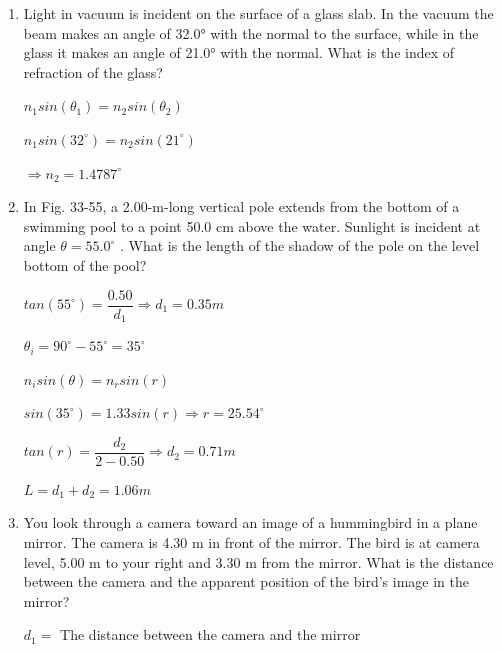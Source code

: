 \documentclass[fleqn]{article}
\begin{document}
  \begin{enumerate}
    \item Light in vacuum is incident on the surface of a glass slab. In the vacuum the beam makes an angle of 32.0° with the normal to the surface, while in the glass it makes an angle of 21.0° with the normal. What is the index of refraction of the glass?

    \textcolor{hwColor}{
      $
        n_1 sin(\theta_1)=n_2 sin(\theta_2)
      $
    }

    \textcolor{hwColor}{
      $
        n_1 sin(32^\circ)=n_2 sin(21^\circ)
      $
    }

    \textcolor{hwColor}{
      $
        \Longrightarrow n_2=1.4787^\circ
      $
    }

    \bigbreak

    \item In Fig. 33-55, a 2.00-m-long vertical pole extends from the bottom of a swimming pool to a point 50.0 cm above the water. Sunlight is incident at angle $\theta=55.0^\circ$ . What is the length of the shadow of the pole on the level bottom of the pool?
    
    \textcolor{hwColor}{
      $
        tan(55^\circ)=\dfrac{0.50}{d_1}
        \Longrightarrow d_1=0.35 m
      $
    }

    \textcolor{hwColor}{
      $
        \theta_i=90^\circ-55^\circ=35^\circ
      $
    }

    \textcolor{hwColor}{
      $
        n_i sin(\theta)=n_r sin(r)
      $
    }

    \textcolor{hwColor}{
      $
        sin(35^\circ)=1.33 sin(r)
        \Longrightarrow r=25.54^\circ
      $
    }

    \textcolor{hwColor}{
      $
        tan(r)=\dfrac{d_2}{2-0.50}
        \Longrightarrow d_2=0.71 m
      $
    }

    
    \textcolor{hwColor}{
      $
        L=d_1+d_2=1.06 m
      $
    }

    \bigbreak

    \item You look through a camera toward an image of a hummingbird in a plane mirror. The camera is 4.30 m in front of the mirror. The bird is at camera level, 5.00 m to your right and 3.30 m from the mirror. What is the distance between the camera and the apparent position of the bird’s image in the mirror?

    \textcolor{hwColor}{
      $d_1=$ The distance between the camera and the mirror
    }


\end{enumerate}
\end{document}

